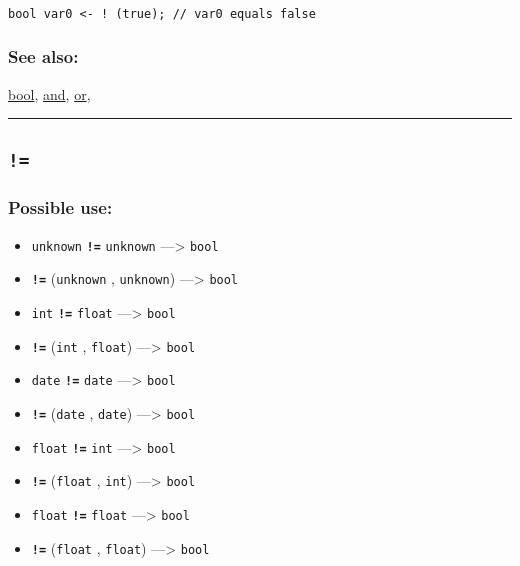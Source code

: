 \documentclass[]{book}
\providecommand{\tightlist}{%
  \setlength{\itemsep}{0pt}\setlength{\parskip}{0pt}}
\theoremstyle{definition}
\theoremstyle{definition}
\theoremstyle{definition}
\theoremstyle{remark}
\begin{document}
\begin{verbatim}
 
bool var0 <- ! (true); // var0 equals false
\end{verbatim}

\subsubsection{See also:}\label{see-also-2}

\href{OperatorsBC\#bool}{bool}, \href{OperatorsAA\#and}{and},
\href{OperatorsNR\#or}{or},

\begin{center}\rule{0.5\linewidth}{\linethickness}\end{center}

\subsection{\texorpdfstring{\texttt{!=}}{!=}}\label{section-5}

\subsubsection{Possible use:}\label{possible-use-4}

\begin{itemize}
\tightlist
\item
  \texttt{unknown} \textbf{\texttt{!=}} \texttt{unknown}
  ---\textgreater{} \texttt{bool}
\item
  \textbf{\texttt{!=}} (\texttt{unknown} , \texttt{unknown})
  ---\textgreater{} \texttt{bool}
\item
  \texttt{int} \textbf{\texttt{!=}} \texttt{float} ---\textgreater{}
  \texttt{bool}
\item
  \textbf{\texttt{!=}} (\texttt{int} , \texttt{float}) ---\textgreater{}
  \texttt{bool}
\item
  \texttt{date} \textbf{\texttt{!=}} \texttt{date} ---\textgreater{}
  \texttt{bool}
\item
  \textbf{\texttt{!=}} (\texttt{date} , \texttt{date}) ---\textgreater{}
  \texttt{bool}
\item
  \texttt{float} \textbf{\texttt{!=}} \texttt{int} ---\textgreater{}
  \texttt{bool}
\item
  \textbf{\texttt{!=}} (\texttt{float} , \texttt{int}) ---\textgreater{}
  \texttt{bool}
\item
  \texttt{float} \textbf{\texttt{!=}} \texttt{float} ---\textgreater{}
  \texttt{bool}
\item
  \textbf{\texttt{!=}} (\texttt{float} , \texttt{float})
  ---\textgreater{} \texttt{bool}
\end{itemize}
\end{document}
